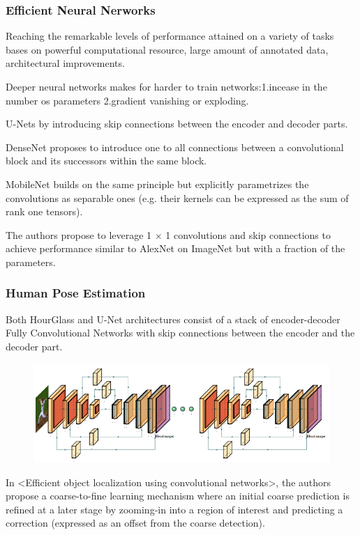 \documentclass[11pt]{article}
\begin{document}
\subsubsection{Efficient Neural Nerworks}
Reaching the remarkable levels of performance attained on a variety of tasks bases on powerful computational resource, large amount of annotated data, architectural improvements.

Deeper neural networks makes for harder to train networks:1.incease in the number os parameters 2.gradient vanishing or exploding.

U-Nets by introducing skip connections between the encoder and decoder parts.

DenseNet proposes to introduce one to all connections between a convolutional block and its successors within the same block.

MobileNet builds on the same principle but explicitly parametrizes the convolutions as separable ones (e.g. their kernels can be expressed as the sum of rank one tensors).

The authors propose to leverage 1 × 1 convolutions and skip connections to achieve performance similar to AlexNet on ImageNet but with a fraction of the parameters.

\subsubsection{Human Pose Estimation}
Both HourGlass and U-Net architectures consist of a stack of encoder-decoder Fully Convolutional Networks with skip connections between the encoder and the decoder part.

\begin{figure}[H]
	\centering
	\includegraphics[scale = 0.5]{59}
\end{figure}

In <Efficient object localization using convolutional networks>, the authors propose a coarse-to-fine learning mechanism where an initial coarse prediction is refined at a later stage by zooming-in into a region of interest and predicting a correction (expressed as an offset from the coarse detection).
\end{document}
